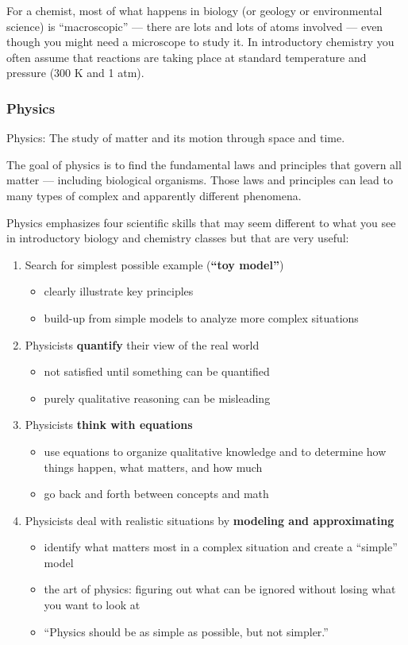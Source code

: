 For a chemist, most of what happens in biology (or geology or environmental science) is ``macroscopic'' --- there are lots and lots of atoms involved --- even though you might need a microscope to study it. In introductory chemistry you often assume that reactions are taking place at standard temperature and pressure (300 K and 1 atm).

\subsubsection{Physics}
Physics: The study of matter and its motion through space and time.

The goal of physics is to find the fundamental laws and principles that govern all matter --- including biological organisms. Those laws and principles can lead to many types of complex and apparently different phenomena.

Physics emphasizes four scientific skills that may seem different to what you see in introductory biology and chemistry classes but that are very useful:

\begin{enumerate}
\item Search for simplest possible example ({\bf ``toy model''})
  \begin{itemize}
    \item clearly illustrate key principles
    \item build-up from simple models to analyze more complex situations
  \end{itemize}
  
\item Physicists {\bf quantify} their view of the real world
  \begin{itemize}
    \item not satisfied until something can be quantified
    \item purely qualitative reasoning can be misleading
  \end{itemize}

\item Physicists {\bf think with equations}
  \begin{itemize}
    \item use equations to organize qualitative knowledge and to determine how things happen, what matters, and how much
    \item go back and forth between concepts and math
  \end{itemize}
  
\item Physicists deal with realistic situations by {\bf modeling and approximating}
  \begin{itemize}
    \item identify what matters most in a complex situation and create a ``simple'' model
    \item the art of physics: figuring out what can be ignored without losing what you want to look at
    \item ``Physics should be as simple as possible, but not simpler.''
  \end{itemize}

\end{enumerate}  

